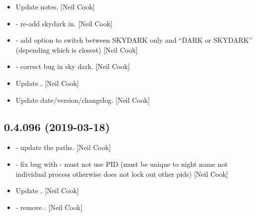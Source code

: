 \documentclass[a4paper,10pt,english]{report}
\begin{document}
\begin{itemize}
\begin{description}
\end{description}

\item {} 
Update notes. {[}Neil Cook{]}

\item {} 
 - re-add skydark in. {[}Neil Cook{]}

\item {} 
 - add option to switch between SKYDARK only
and “DARK or SKYDARK” (depending which is closest) {[}Neil Cook{]}

\item {} 
 - correct bug in sky dark. {[}Neil Cook{]}

\item {} 
Update . {[}Neil Cook{]}

\item {} 
Update date/version/changelog. {[}Neil Cook{]}

\end{itemize}


\subsection{0.4.096 (2019-03-18)}
\label{\detokenize{misc/changelog:id163}}\begin{itemize}
\item {} 
 - update the paths. {[}Neil Cook{]}

\item {} 
 - fix bug with  - must not use PID
(must be unique to night name not individual process otherwise does
not lock out other pids) {[}Neil Cook{]}

\item {} 
Update . {[}Neil Cook{]}

\item {} 
 - remove . {[}Neil Cook{]}

\end{itemize}
\end{document}
